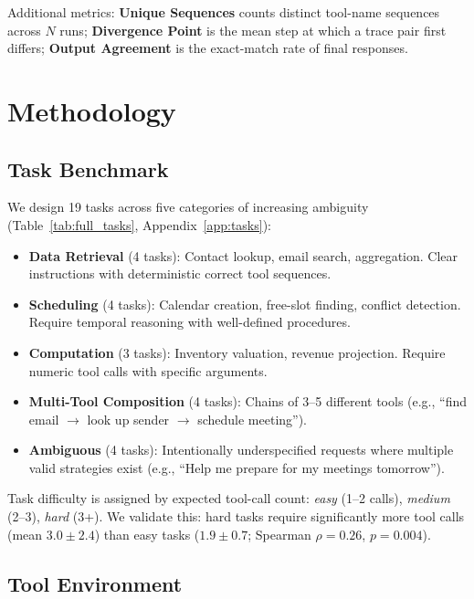 \documentclass[letterpaper]{article}
\begin{document}
Additional metrics: \textbf{Unique Sequences} counts distinct tool-name sequences
across $N$ runs; \textbf{Divergence Point} is the mean step at which a trace pair
first differs; \textbf{Output Agreement} is the exact-match rate of final
responses.

\section{Methodology}

\subsection{Task Benchmark}
\label{sec:benchmark}

We design 19 tasks across five categories of increasing ambiguity
(Table~\ref{tab:full_tasks}, Appendix~\ref{app:tasks}):

\begin{itemize}[leftmargin=1.5em]
  \item \textbf{Data Retrieval} (4 tasks): Contact lookup, email search, aggregation.
    Clear instructions with deterministic correct tool sequences.
  \item \textbf{Scheduling} (4 tasks): Calendar creation, free-slot finding, conflict
    detection. Require temporal reasoning with well-defined procedures.
  \item \textbf{Computation} (3 tasks): Inventory valuation, revenue projection.
    Require numeric tool calls with specific arguments.
  \item \textbf{Multi-Tool Composition} (4 tasks): Chains of 3--5 different tools
    (e.g., ``find email $\to$ look up sender $\to$ schedule meeting'').
  \item \textbf{Ambiguous} (4 tasks): Intentionally underspecified requests where
    multiple valid strategies exist
    (e.g., ``Help me prepare for my meetings tomorrow'').
\end{itemize}

\noindent
Task difficulty is assigned by expected tool-call count: \emph{easy} (1--2 calls),
\emph{medium} (2--3), \emph{hard} (3+). We validate this: hard tasks require
significantly more tool calls (mean $3.0 \pm 2.4$) than easy tasks
($1.9 \pm 0.7$; Spearman $\rho = 0.26$, $p = 0.004$).

\subsection{Tool Environment}
\end{document}
